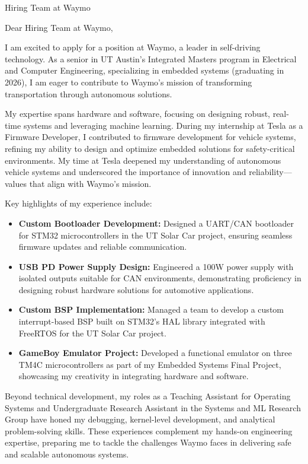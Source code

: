 \documentclass[a4paper,10pt]{letter}
\begin{document}
\begin{letter}{Hiring Team at Waymo}

\opening{Dear Hiring Team at Waymo,}
I am excited to apply for a position at Waymo, a leader in self-driving technology. As a senior in UT Austin's Integrated Masters program in Electrical and Computer Engineering, specializing in embedded systems (graduating in 2026), I am eager to contribute to Waymo's mission of transforming transportation through autonomous solutions.

My expertise spans hardware and software, focusing on designing robust, real-time systems and leveraging machine learning. During my internship at Tesla as a Firmware Developer, I contributed to firmware development for vehicle systems, refining my ability to design and optimize embedded solutions for safety-critical environments. My time at Tesla deepened my understanding of autonomous vehicle systems and underscored the importance of innovation and reliability—values that align with Waymo's mission.

Key highlights of my experience include:

\begin{itemize}
    \item \textbf{Custom Bootloader Development:} Designed a UART/CAN bootloader for STM32 microcontrollers in the UT Solar Car project, ensuring seamless firmware updates and reliable communication.
    \item \textbf{USB PD Power Supply Design:} Engineered a 100W power supply with isolated outputs suitable for CAN environments, demonstrating proficiency in designing robust hardware solutions for automotive applications.
    \item \textbf{Custom BSP Implementation:} Managed a team to develop a custom interrupt-based BSP built on STM32's HAL library integrated with FreeRTOS for the UT Solar Car project.
    \item \textbf{GameBoy Emulator Project:} Developed a functional emulator on three TM4C microcontrollers as part of my Embedded Systems Final Project, showcasing my creativity in integrating hardware and software.
\end{itemize}

Beyond technical development, my roles as a Teaching Assistant for Operating Systems and Undergraduate Research Assistant in the Systems and ML Research Group have honed my debugging, kernel-level development, and analytical problem-solving skills. These experiences complement my hands-on engineering expertise, preparing me to tackle the challenges Waymo faces in delivering safe and scalable autonomous systems.


\end{letter}
\end{document}
